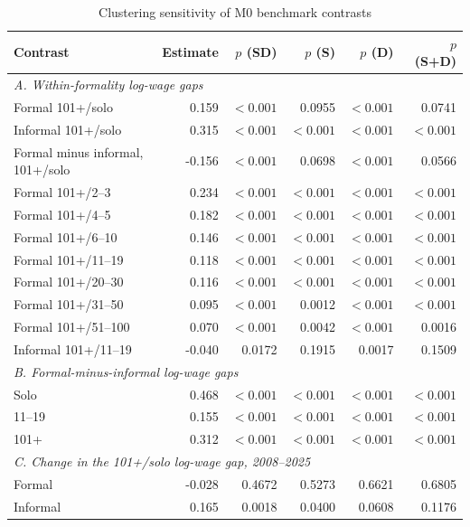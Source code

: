 \begin{table}[htbp]
  \centering
  \caption{Clustering sensitivity of M0 benchmark contrasts}
  \label{tab:preferred-clustering-comparison}
  \small
  \setlength{\tabcolsep}{5pt}
  \begin{tabular}{@{}p{}rrrrr@{}}
    \toprule
    Contrast & Estimate & $p$ (SD) & $p$ (S) & $p$ (D) & $p$ (S+D) \\
    \midrule
    \multicolumn{6}{l}{\textit{A. Within-formality log-wage gaps}} \\
    Formal 101+/solo & 0.159 & $<0.001$ & 0.0955 & $<0.001$ & 0.0741 \\
    Informal 101+/solo & 0.315 & $<0.001$ & $<0.001$ & $<0.001$ & $<0.001$ \\
    Formal minus informal, 101+/solo & -0.156 & $<0.001$ & 0.0698 & $<0.001$ & 0.0566 \\
    Formal 101+/2--3 & 0.234 & $<0.001$ & $<0.001$ & $<0.001$ & $<0.001$ \\
    Formal 101+/4--5 & 0.182 & $<0.001$ & $<0.001$ & $<0.001$ & $<0.001$ \\
    Formal 101+/6--10 & 0.146 & $<0.001$ & $<0.001$ & $<0.001$ & $<0.001$ \\
    Formal 101+/11--19 & 0.118 & $<0.001$ & $<0.001$ & $<0.001$ & $<0.001$ \\
    Formal 101+/20--30 & 0.116 & $<0.001$ & $<0.001$ & $<0.001$ & $<0.001$ \\
    Formal 101+/31--50 & 0.095 & $<0.001$ & 0.0012 & $<0.001$ & $<0.001$ \\
    Formal 101+/51--100 & 0.070 & $<0.001$ & 0.0042 & $<0.001$ & 0.0016 \\
    Informal 101+/11--19 & -0.040 & 0.0172 & 0.1915 & 0.0017 & 0.1509 \\
    \midrule
    \multicolumn{6}{l}{\textit{B. Formal-minus-informal log-wage gaps}} \\
    Solo & 0.468 & $<0.001$ & $<0.001$ & $<0.001$ & $<0.001$ \\
    11--19 & 0.155 & $<0.001$ & $<0.001$ & $<0.001$ & $<0.001$ \\
    101+ & 0.312 & $<0.001$ & $<0.001$ & $<0.001$ & $<0.001$ \\
    \midrule
    \multicolumn{6}{l}{\textit{C. Change in the 101+/solo log-wage gap, 2008--2025}} \\
    Formal & -0.028 & 0.4672 & 0.5273 & 0.6621 & 0.6805 \\
    Informal & 0.165 & 0.0018 & 0.0400 & 0.0608 & 0.1176 \\

\end{tabular}
\end{table}
